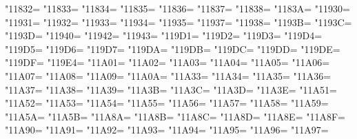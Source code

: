 \XeTeXcharclass"11832=\KclassCM
\XeTeXcharclass"11833=\KclassCM
\XeTeXcharclass"11834=\KclassCM
\XeTeXcharclass"11835=\KclassCM
\XeTeXcharclass"11836=\KclassCM
\XeTeXcharclass"11837=\KclassCM
\XeTeXcharclass"11838=\KclassCM
\XeTeXcharclass"1183A=\KclassCM
\XeTeXcharclass"11930=\KclassCM
\XeTeXcharclass"11931=\KclassCM
\XeTeXcharclass"11932=\KclassCM
\XeTeXcharclass"11933=\KclassCM
\XeTeXcharclass"11934=\KclassCM
\XeTeXcharclass"11935=\KclassCM
\XeTeXcharclass"11937=\KclassCM
\XeTeXcharclass"11938=\KclassCM
\XeTeXcharclass"1193B=\KclassCM
\XeTeXcharclass"1193C=\KclassCM
\XeTeXcharclass"1193D=\KclassCM
\XeTeXcharclass"11940=\KclassCM
\XeTeXcharclass"11942=\KclassCM
\XeTeXcharclass"11943=\KclassCM
\XeTeXcharclass"119D1=\KclassCM
\XeTeXcharclass"119D2=\KclassCM
\XeTeXcharclass"119D3=\KclassCM
\XeTeXcharclass"119D4=\KclassCM
\XeTeXcharclass"119D5=\KclassCM
\XeTeXcharclass"119D6=\KclassCM
\XeTeXcharclass"119D7=\KclassCM
\XeTeXcharclass"119DA=\KclassCM
\XeTeXcharclass"119DB=\KclassCM
\XeTeXcharclass"119DC=\KclassCM
\XeTeXcharclass"119DD=\KclassCM
\XeTeXcharclass"119DE=\KclassCM
\XeTeXcharclass"119DF=\KclassCM
\XeTeXcharclass"119E4=\KclassCM
\XeTeXcharclass"11A01=\KclassCM
\XeTeXcharclass"11A02=\KclassCM
\XeTeXcharclass"11A03=\KclassCM
\XeTeXcharclass"11A04=\KclassCM
\XeTeXcharclass"11A05=\KclassCM
\XeTeXcharclass"11A06=\KclassCM
\XeTeXcharclass"11A07=\KclassCM
\XeTeXcharclass"11A08=\KclassCM
\XeTeXcharclass"11A09=\KclassCM
\XeTeXcharclass"11A0A=\KclassCM
\XeTeXcharclass"11A33=\KclassCM
\XeTeXcharclass"11A34=\KclassCM
\XeTeXcharclass"11A35=\KclassCM
\XeTeXcharclass"11A36=\KclassCM
\XeTeXcharclass"11A37=\KclassCM
\XeTeXcharclass"11A38=\KclassCM
\XeTeXcharclass"11A39=\KclassCM
\XeTeXcharclass"11A3B=\KclassCM
\XeTeXcharclass"11A3C=\KclassCM
\XeTeXcharclass"11A3D=\KclassCM
\XeTeXcharclass"11A3E=\KclassCM
\XeTeXcharclass"11A51=\KclassCM
\XeTeXcharclass"11A52=\KclassCM
\XeTeXcharclass"11A53=\KclassCM
\XeTeXcharclass"11A54=\KclassCM
\XeTeXcharclass"11A55=\KclassCM
\XeTeXcharclass"11A56=\KclassCM
\XeTeXcharclass"11A57=\KclassCM
\XeTeXcharclass"11A58=\KclassCM
\XeTeXcharclass"11A59=\KclassCM
\XeTeXcharclass"11A5A=\KclassCM
\XeTeXcharclass"11A5B=\KclassCM
\XeTeXcharclass"11A8A=\KclassCM
\XeTeXcharclass"11A8B=\KclassCM
\XeTeXcharclass"11A8C=\KclassCM
\XeTeXcharclass"11A8D=\KclassCM
\XeTeXcharclass"11A8E=\KclassCM
\XeTeXcharclass"11A8F=\KclassCM
\XeTeXcharclass"11A90=\KclassCM
\XeTeXcharclass"11A91=\KclassCM
\XeTeXcharclass"11A92=\KclassCM
\XeTeXcharclass"11A93=\KclassCM
\XeTeXcharclass"11A94=\KclassCM
\XeTeXcharclass"11A95=\KclassCM
\XeTeXcharclass"11A96=\KclassCM
\XeTeXcharclass"11A97=\KclassCM
